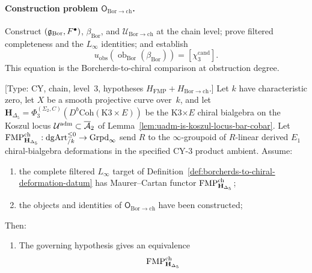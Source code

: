 \paragraph{Construction problem
$\mathsf O_{\mathrm{Bor}\to\mathrm{ch}}$.}
\label{obl:borcherds-to-chiral-Linfty}
Construct $(\mathfrak g_{\mathrm{Bor}},F^\bullet)$,
$\beta_{\mathrm{Bor}}$, and
$\mathcal U_{\mathrm{Bor}\to\mathrm{ch}}$ at the chain level; prove
filtered completeness and the $L_\infty$ identities; and establish
\begin{equation}
\label{eq:borcherds-obstruction-target-chi3}
 u_{\mathrm{obs}}\!\left(
 \operatorname{ob}_{\mathrm{Bor}}(\beta_{\mathrm{Bor}})\right)
 =[\chi_3^{\mathrm{cand}}].
\end{equation}
This equation is the Borcherds-to-chiral comparison at obstruction
degree.

\begin{theorem}
\label{thm:chirhoch3-Delta5-derived-deformation}
\ClaimStatusConditional
\textup{[Type: CY, chain, level~$3$, hypotheses
$H_{\mathrm{FMP}}+H_{\mathrm{Bor}\to\mathrm{ch}}$.]}
Let $k$ have characteristic zero, let $X$ be a smooth projective
curve over~$k$, and let
$\mathbf H_{\Delta_5}=
\Phi_3^{(\Sigma_2,C)}(D^b\mathrm{Coh}(\mathrm{K3}\times E))$
be the K3$\times E$ chiral bialgebra on the Koszul locus
$\mathcal U^{\mathrm{adm}}\subset\overline{\mathcal A}_2$ of
Lemma~\textup{\ref{lem:uadm-is-koszul-locus-bar-cobar}}. Let
$\mathrm{FMP}_{\mathbf H_{\Delta_5}}^{\mathrm{ch}}:\mathrm{dgArt}_{/k}^{\le 0}\to
\mathrm{Grpd}_\infty$ send $R$ to the $\infty$-groupoid of
$R$-linear derived $E_1$ chiral-bialgebra deformations in the
specified CY-$3$ product ambient.  Assume:
\begin{enumerate}[leftmargin=6.2em]
\item[$H_{\mathrm{FMP}}$]\label{hyp:fmp-governed-chiral}
the complete filtered $L_\infty$ target of
Definition~\ref{def:borcherds-to-chiral-deformation-datum} has
Maurer--Cartan functor $\mathrm{FMP}_{\mathbf H_{\Delta_5}}^{\mathrm{ch}}$;
\item[$H_{\mathrm{Bor}\to\mathrm{ch}}$]\label{hyp:borcherds-chiral-datum}
  the objects and identities of
  $\mathsf O_{\mathrm{Bor}\to\mathrm{ch}}$ have been constructed;
\end{enumerate}
Then:
\begin{enumerate}[label=\textup{(\roman*)}]
 \item The governing hypothesis gives an equivalence
 \begin{equation}
 \label{eq:lurie-FMP-chirhoch}
 \FMP_{\mathbf H_{\Delta_5}}^{\mathrm{ch}}

\end{equation}
\end{enumerate}
\end{theorem}
